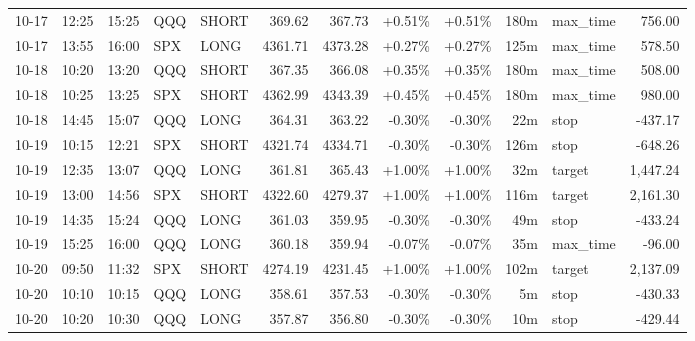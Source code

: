 \documentclass[11pt,a4paper,twoside]{article}
\begin{document}
\begin{center}
\begin{longtable}{>{\color{txtmain}}l l l l l r r r r r >{\color{txtmain}}l r}
10-17 & 12:25 & 15:25 & QQQ & SHORT & 369.62 & 367.73 & \textcolor{wingreen}{+0.51\%} & \textcolor{wingreen}{+0.51\%} & 180m & max\_time & \textcolor{wingreen}{756.00} \\
10-17 & 13:55 & 16:00 & SPX & LONG & 4361.71 & 4373.28 & \textcolor{wingreen}{+0.27\%} & \textcolor{wingreen}{+0.27\%} & 125m & max\_time & \textcolor{wingreen}{578.50} \\
10-18 & 10:20 & 13:20 & QQQ & SHORT & 367.35 & 366.08 & \textcolor{wingreen}{+0.35\%} & \textcolor{wingreen}{+0.35\%} & 180m & max\_time & \textcolor{wingreen}{508.00} \\
10-18 & 10:25 & 13:25 & SPX & SHORT & 4362.99 & 4343.39 & \textcolor{wingreen}{+0.45\%} & \textcolor{wingreen}{+0.45\%} & 180m & max\_time & \textcolor{wingreen}{980.00} \\
10-18 & 14:45 & 15:07 & QQQ & LONG & 364.31 & 363.22 & \textcolor{lossred}{-0.30\%} & \textcolor{lossred}{-0.30\%} & 22m & stop & \textcolor{lossred}{-437.17} \\
10-19 & 10:15 & 12:21 & SPX & SHORT & 4321.74 & 4334.71 & \textcolor{lossred}{-0.30\%} & \textcolor{lossred}{-0.30\%} & 126m & stop & \textcolor{lossred}{-648.26} \\
10-19 & 12:35 & 13:07 & QQQ & LONG & 361.81 & 365.43 & \textcolor{wingreen}{+1.00\%} & \textcolor{wingreen}{+1.00\%} & 32m & target & \textcolor{wingreen}{1,447.24} \\
10-19 & 13:00 & 14:56 & SPX & SHORT & 4322.60 & 4279.37 & \textcolor{wingreen}{+1.00\%} & \textcolor{wingreen}{+1.00\%} & 116m & target & \textcolor{wingreen}{2,161.30} \\
10-19 & 14:35 & 15:24 & QQQ & LONG & 361.03 & 359.95 & \textcolor{lossred}{-0.30\%} & \textcolor{lossred}{-0.30\%} & 49m & stop & \textcolor{lossred}{-433.24} \\
10-19 & 15:25 & 16:00 & QQQ & LONG & 360.18 & 359.94 & \textcolor{lossred}{-0.07\%} & \textcolor{lossred}{-0.07\%} & 35m & max\_time & \textcolor{lossred}{-96.00} \\
10-20 & 09:50 & 11:32 & SPX & SHORT & 4274.19 & 4231.45 & \textcolor{wingreen}{+1.00\%} & \textcolor{wingreen}{+1.00\%} & 102m & target & \textcolor{wingreen}{2,137.09} \\
10-20 & 10:10 & 10:15 & QQQ & LONG & 358.61 & 357.53 & \textcolor{lossred}{-0.30\%} & \textcolor{lossred}{-0.30\%} & 5m & stop & \textcolor{lossred}{-430.33} \\
10-20 & 10:20 & 10:30 & QQQ & LONG & 357.87 & 356.80 & \textcolor{lossred}{-0.30\%} & \textcolor{lossred}{-0.30\%} & 10m & stop & \textcolor{lossred}{-429.44} \\

\end{longtable}
\end{center}
\end{document}
